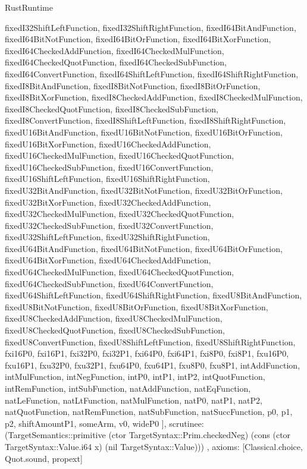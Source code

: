 \begin{lexlean}{RustRuntime}
\begin{semanticmodule}
{{      fixedI32ShiftLeftFunction,
      fixedI32ShiftRightFunction,
      fixedI64BitAndFunction,
      fixedI64BitNotFunction,
      fixedI64BitOrFunction,
      fixedI64BitXorFunction,
      fixedI64CheckedAddFunction,
      fixedI64CheckedMulFunction,
      fixedI64CheckedQuotFunction,
      fixedI64CheckedSubFunction,
      fixedI64ConvertFunction,
      fixedI64ShiftLeftFunction,
      fixedI64ShiftRightFunction,
      fixedI8BitAndFunction,
      fixedI8BitNotFunction,
      fixedI8BitOrFunction,
      fixedI8BitXorFunction,
      fixedI8CheckedAddFunction,
      fixedI8CheckedMulFunction,
      fixedI8CheckedQuotFunction,
      fixedI8CheckedSubFunction,
      fixedI8ConvertFunction,
      fixedI8ShiftLeftFunction,
      fixedI8ShiftRightFunction,
      fixedU16BitAndFunction,
      fixedU16BitNotFunction,
      fixedU16BitOrFunction,
      fixedU16BitXorFunction,
      fixedU16CheckedAddFunction,
      fixedU16CheckedMulFunction,
      fixedU16CheckedQuotFunction,
      fixedU16CheckedSubFunction,
      fixedU16ConvertFunction,
      fixedU16ShiftLeftFunction,
      fixedU16ShiftRightFunction,
      fixedU32BitAndFunction,
      fixedU32BitNotFunction,
      fixedU32BitOrFunction,
      fixedU32BitXorFunction,
      fixedU32CheckedAddFunction,
      fixedU32CheckedMulFunction,
      fixedU32CheckedQuotFunction,
      fixedU32CheckedSubFunction,
      fixedU32ConvertFunction,
      fixedU32ShiftLeftFunction,
      fixedU32ShiftRightFunction,
      fixedU64BitAndFunction,
      fixedU64BitNotFunction,
      fixedU64BitOrFunction,
      fixedU64BitXorFunction,
      fixedU64CheckedAddFunction,
      fixedU64CheckedMulFunction,
      fixedU64CheckedQuotFunction,
      fixedU64CheckedSubFunction,
      fixedU64ConvertFunction,
      fixedU64ShiftLeftFunction,
      fixedU64ShiftRightFunction,
      fixedU8BitAndFunction,
      fixedU8BitNotFunction,
      fixedU8BitOrFunction,
      fixedU8BitXorFunction,
      fixedU8CheckedAddFunction,
      fixedU8CheckedMulFunction,
      fixedU8CheckedQuotFunction,
      fixedU8CheckedSubFunction,
      fixedU8ConvertFunction,
      fixedU8ShiftLeftFunction,
      fixedU8ShiftRightFunction,
      fxi16P0,
      fxi16P1,
      fxi32P0,
      fxi32P1,
      fxi64P0,
      fxi64P1,
      fxi8P0,
      fxi8P1,
      fxu16P0,
      fxu16P1,
      fxu32P0,
      fxu32P1,
      fxu64P0,
      fxu64P1,
      fxu8P0,
      fxu8P1,
      intAddFunction,
      intMulFunction,
      intNegFunction,
      intP0,
      intP1,
      intP2,
      intQuotFunction,
      intRemFunction,
      intSubFunction,
      natAddFunction,
      natEqFunction,
      natLeFunction,
      natLtFunction,
      natMulFunction,
      natP0,
      natP1,
      natP2,
      natQuotFunction,
      natRemFunction,
      natSubFunction,
      natSuccFunction,
      p0,
      p1,
      p2,
      shiftAmountP1,
      someArm,
      v0,
      wideP0
    ],
    scrutinee: (TargetSemantics::primitive (ctor TargetSyntax::Prim.checkedNeg) (cons (ctor TargetSyntax::Value.i64 x) (nil TargetSyntax::Value)))
  },
  axioms: [Classical.choice, Quot.sound, propext]
}
\end{semanticmodule}
\end{lexlean}

